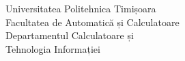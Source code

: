 \begin{titlepage}
    \begin{center}
        \begin{minipage}{0.3\textwidth}
        \end{minipage}%
        \begin{minipage}{0.4\textwidth}
            \centering
            \scriptsize
            Universitatea Politehnica Timișoara\\
            Facultatea de Automatică și Calculatoare\\
            Departamentul Calculatoare și \\Tehnologia Informației
        \end{minipage}%
        \begin{minipage}{0.3\textwidth}

\end{minipage}
\end{center}
\end{titlepage}
